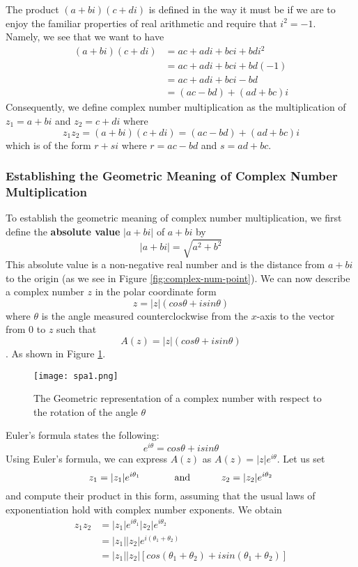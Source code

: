 \documentclass{article}
\begin{document}
The product $(a+bi)(c+di)$ is defined in the way it must be if we are to enjoy the familiar properties of real arithmetic and require that \(i^2 = -1\). \\ 
Namely, we see that we want to have 
\begin{align*}
    (a+bi)(c+di) &= ac + adi + bci + bdi^2 \\
                 &= ac + adi + bci + bd(-1) \\
                 &= ac + adi + bci - bd \\
                 &= (ac - bd) + (ad + bc)i
\end{align*}
Consequently, we define complex number multiplication as the multiplication of $z_1 = a + bi$ and $z_2 = c + di$ where 
\[z_1z_2 = (a+bi)(c+di) = (ac - bd) + (ad + bc)i\]
which is of the form $r + si$ where $r = ac - bd$ and $s = ad + bc$. 
\subsubsection{Establishing the Geometric Meaning of Complex Number Multiplication}\cite[p.$\Tilde{13-14}$]{Fraleigh2003} 
To establish the geometric meaning of complex number multiplication, we first define the \textbf{absolute value} $|a + bi|$ of \(a + bi\) by \[|a + bi| = \sqrt{a^2 + b^2}\] This absolute value is a non-negative real number and is the distance from \(a + bi\) to the origin (as we see in Figure \ref{fig:complex-num-point}). We can now describe a complex number \(z\) in the polar coordinate form \[z = |z|(cos\theta + isin\theta)\] where \(\theta\) is the angle measured counterclockwise from the \(x\)-axis to the vector from \(0\) to \(z\) such that $$A(z) = |z|(cos\theta + isin\theta)$$.  As shown in Figure \ref{fig:ang-rot}. 

\begin{figure}[H]
      \centering
    \texttt{[image: spa1.png]}
    \caption{The Geometric representation of a complex number with respect to the rotation of the angle $\theta$\cite{byju's2024}}
    \label{fig:ang-rot}
\end{figure} 

Euler's formula states the following: $$e^{i\theta} = cos\theta + isin\theta$$  Using Euler's formula, we can express $A(z)$ as $A(z) = |z|e^{i\theta}$. Let us set \[z_1 = |z_1|e^{i\theta_1}  \text{ \hspace{1cm} and \hspace{1cm}} z_2 = |z_2|e^{i\theta_2}\] and compute their product in this form, assuming that the usual laws of exponentiation hold with complex number exponents. We obtain 
\begin{align*}
    z_1z_2 &= |z_1|e^{i\theta_1}|z_2|e^{i\theta_2} \\ 
           &= |z_1||z_2|e^{i(\theta_1 + \theta_2)} \\ 
           &= |z_1||z_2|[cos(\theta_1 + \theta_2) + isin(\theta_1 + \theta_2)]
\end{align*} 
\end{document}

